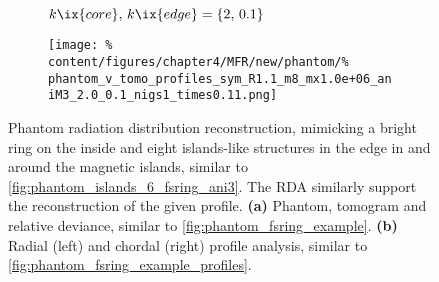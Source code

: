             \begin{figure}[h]%
                \centering%
                \begin{subfigure}{\textwidth}%
                    \centering%
                    \caption{$k\ix{core},\,k\ix{edge}=\left\{2,\,0.1\right\}$}%
                \end{subfigure}%
                \newline%
                \begin{subfigure}{\textwidth}%
                    \centering%
                    \texttt{[image: \%
                        content/figures/chapter4/MFR/new/phantom/\%
                        phantom\_v\_tomo\_profiles\_sym\_R1.1\_m8\_mx1.0e+06\_aniM3\_2.0\_0.1\_nigs1\_times0.11.png]}%
                    \caption{}%
                \end{subfigure}%
                \caption{Phantom radiation distribution reconstruction, mimicking a bright ring on the inside and eight islands-like structures in the edge in and around the magnetic islands, similar to \cref{fig:phantom_islands_6_fsring_ani3}. The RDA similarly support the reconstruction of the given profile. \textbf{(a)} Phantom, tomogram and relative deviance, similar to \cref{fig:phantom_fsring_example}. \textbf{(b)} Radial (left) and chordal (right) profile analysis, similar to \cref{fig:phantom_fsring_example_profiles}.}\label{fig:phantom_islands_8}%
            \end{figure}%
%
            \vfill%
%